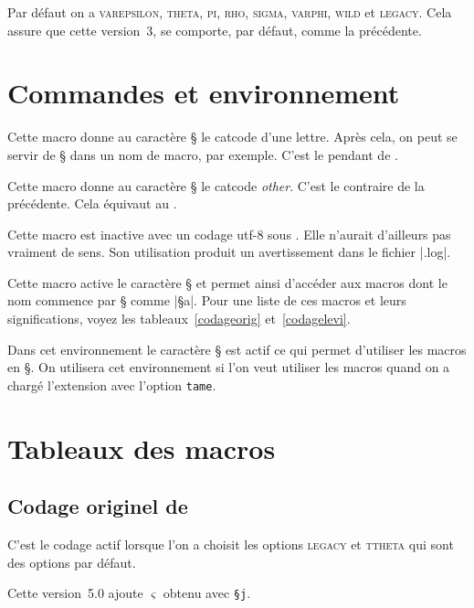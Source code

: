 \documentclass[full, french]{l3doc}
\newcommand*\PSVerb[1]{\texttt{\S #1}}
\newcommand\Option[1]{\textsc{#1}}
\begin{document}
Par défaut on a \Option{varepsilon}, \Option{theta}, \Option{pi},
\Option{rho}, \Option{sigma}, \Option{varphi}, \Option{wild} et
\Option{legacy}. Cela assure que cette version~3, se comporte,
par défaut, comme la précédente.

\section{Commandes et environnement}

\DescribeMacro{\makeparesseletter}
Cette macro donne au \og caractère \fg § le catcode d'une
lettre. Après cela, on peut se servir de § dans un nom de macro, par
exemple. C'est le pendant de .

\DescribeMacro{\makeparesseother}
Cette macro donne au caractère § le catcode \emph{other}. C'est le \og
contraire \fg de la précédente. Cela équivaut au .

Cette macro est inactive avec un codage utf-8 sous
. Elle n'aurait d'ailleurs pas vraiment de sens. Son
utilisation produit un avertissement dans le fichier |.log|.

\DescribeMacro{\ActiveLaParesse}
Cette macro active le caractère § et permet ainsi d'accéder aux
macros dont le nom commence par § comme |§a|. Pour une liste de ces
macros et leurs significations, voyez les tableaux~\ref{codageorig}
et~\ref{codagelevi}.

Dans cet environnement le caractère § est actif ce qui permet
d'utiliser les macros en §.  On utilisera cet environnement si l'on
veut utiliser les macros quand on a chargé l'extension
 avec l'option \texttt{tame}.

\newpage{}

\section{Tableaux des macros}

\subsection{Codage originel de }

C'est le codage actif lorsque l'on a choisit les options \Option{legacy} et
\Option{ttheta} qui sont des options par défaut.

Cette version~5.0 ajoute \(\varsigma\) obtenu avec \PSVerb{j}.
\end{document}
